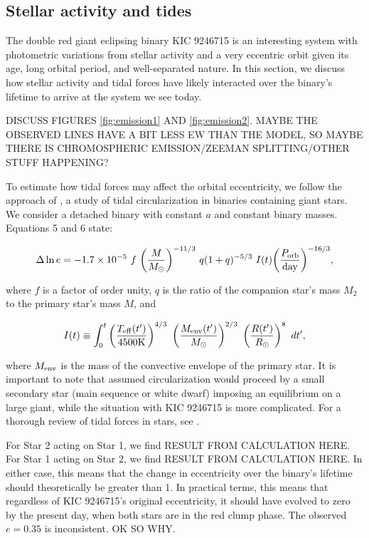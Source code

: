 \subsection{Stellar activity and tides}\label{context}
The double red giant eclipsing binary KIC 9246715 is an interesting system with photometric variations from stellar activity and a very eccentric orbit given its age, long orbital period, and well-separated nature. In this section, we discuss how stellar activity and tidal forces have likely interacted over the binary's lifetime to arrive at the system we see today.

DISCUSS FIGURES \ref{fig:emission1} AND \ref{fig:emission2}. MAYBE THE OBSERVED LINES HAVE A BIT LESS EW THAN THE MODEL, SO MAYBE THERE IS CHROMOSPHERIC EMISSION/ZEEMAN SPLITTING/OTHER STUFF HAPPENING? \citep{har73,fro12}

To estimate how tidal forces may affect the orbital eccentricity, we follow the approach of \citet{ver95}, a study of tidal circularization in binaries containing giant stars. We consider a detached binary with constant $a$ and constant binary masses. Equations 5 and 6 \citep{ver95} state:

\begin{equation}\label{tide1}
\Delta \ln e = -1.7 \times 10^{-5} \ f \ {\left( \frac{M}{M_{\odot}} \right)}^{-11/3} \ q(1+q)^{-5/3} \ I(t) {\left( \frac{P_{\rm{orb}}}{\rm{day}} \right)}^{-16/3},
\end{equation}

where $f$ is a factor of order unity, $q$ is the ratio of the companion star's mass $M_2$ to the primary star's mass $M$, and

\begin{equation}
I(t) \equiv \int_0^t \left( \frac{T_{\rm{eff}}(t')}{4500 \rm{K}} \right)^{4/3} \ \left( \frac{M_{\rm{env}}(t')}{M_{\odot}} \right)^{2/3} \ \left( \frac{R(t')}{R_{\odot}} \right)^8 \ dt',
\end{equation}

where $M_{\rm{env}}$ is the mass of the convective envelope of the primary star. It is important to note that \citet{ver95} assumed circularization would proceed by a small secondary star (main sequence or white dwarf) imposing an equilibrium on a large giant, while the situation with KIC 9246715 is more complicated. For a thorough review of tidal forces in stars, see \citet{ogi14}.

For Star 2 acting on Star 1, we find RESULT FROM CALCULATION HERE. For Star 1 acting on Star 2, we find RESULT FROM CALCULATION HERE. In either case, this means that the change in eccentricity over the binary's lifetime should theoretically be greater than 1. In practical terms, this means that regardless of KIC 9246715's original eccentricity, it should have evolved to zero by the present day, when both stars are in the red clump phase. The observed $e = 0.35$ is inconsistent. OK SO WHY.

